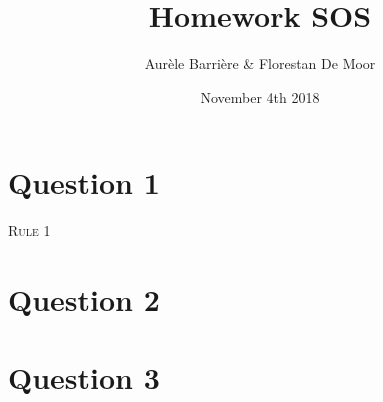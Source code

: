 \documentclass{article}
\title{Homework SOS}
\author{Aur\`ele Barri\`ere \& Florestan De Moor}
\date{November 4th 2018}
\begin{document}
\section*{Question 1}
\textsc{Rule 1}\quad{}

\section*{Question 2}

\section*{Question 3}
\end{document}
